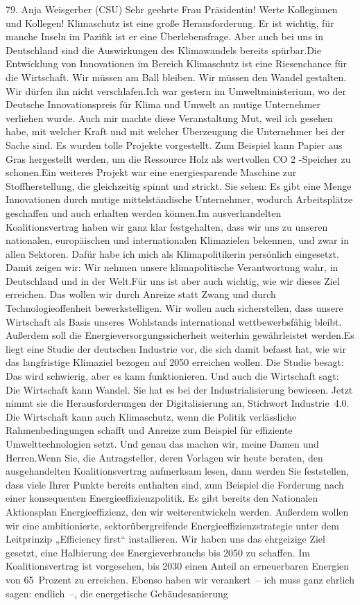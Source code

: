 \documentclass{article}
\begin{document}
	79. Anja Weisgerber (CSU) Sehr geehrte Frau Präsidentin! Werte Kolleginnen und Kollegen! Klimaschutz ist eine große Herausforderung. Er ist wichtig, für manche Inseln im Pazifik ist er eine Überlebensfrage. Aber auch bei uns in Deutschland sind die Auswirkungen des Klimawandels bereits spürbar.Die Entwicklung von Innovationen im Bereich Klimaschutz ist eine Riesenchance für die Wirtschaft. Wir müssen am Ball bleiben. Wir müssen den Wandel gestalten. Wir dürfen ihn nicht verschlafen.Ich war gestern im Umweltministerium, wo der Deutsche Innovationspreis für Klima und Umwelt an mutige Unternehmer verliehen wurde. Auch mir machte diese Veranstaltung Mut, weil ich gesehen habe, mit welcher Kraft und mit welcher Überzeugung die Unternehmer bei der Sache sind. Es wurden tolle Projekte vorgestellt. Zum Beispiel kann Papier aus Gras hergestellt werden, um die Ressource Holz als wertvollen CO 2 -Speicher zu schonen.Ein weiteres Projekt war eine energiesparende Maschine zur Stoffherstellung, die gleichzeitig spinnt und strickt. Sie sehen: Es gibt eine Menge Innovationen durch mutige mittelständische Unternehmer, wodurch Arbeitsplätze geschaffen und auch erhalten werden können.Im ausverhandelten Koalitionsvertrag haben wir ganz klar festgehalten, dass wir uns zu unseren nationalen, europäischen und internationalen Klimazielen bekennen, und zwar in allen Sektoren. Dafür habe ich mich als Klimapolitikerin persönlich eingesetzt. Damit zeigen wir: Wir nehmen unsere klimapolitische Verantwortung wahr, in Deutschland und in der Welt.Für uns ist aber auch wichtig, wie wir dieses Ziel erreichen. Das wollen wir durch Anreize statt Zwang und durch Technologieoffenheit bewerkstelligen. Wir wollen auch sicherstellen, dass unsere Wirtschaft als Basis unseres Wohlstands international wettbewerbsfähig bleibt. Außerdem soll die Energieversorgungssicherheit weiterhin gewährleistet werden.Es liegt eine Studie der deutschen Industrie vor, die sich damit befasst hat, wie wir das langfristige Klimaziel bezogen auf 2050 erreichen wollen. Die Studie besagt: Das wird schwierig, aber es kann funktionieren. Und auch die Wirtschaft sagt: Die Wirtschaft kann Wandel. Sie hat es bei der Industrialisierung bewiesen. Jetzt nimmt sie die Herausforderungen der Digitalisierung an, Stichwort Industrie 4.0. Die Wirtschaft kann auch Klimaschutz, wenn die Politik verlässliche Rahmenbedingungen schafft und Anreize zum Beispiel für effiziente Umwelttechnologien setzt. Und genau das machen wir, meine Damen und Herren.Wenn Sie, die Antragsteller, deren Vorlagen wir heute beraten, den ausgehandelten Koalitionsvertrag aufmerksam lesen, dann werden Sie feststellen, dass viele Ihrer Punkte bereits enthalten sind, zum Beispiel die Forderung nach einer konsequenten Energieeffizienzpolitik. Es gibt bereits den Nationalen Aktionsplan Energieeffizienz, den wir weiterentwickeln werden. Außerdem wollen wir eine ambitionierte, sektorübergreifende Energieeffizienzstrategie unter dem Leitprinzip „Efficiency first“ installieren. Wir haben uns das ehrgeizige Ziel gesetzt, eine Halbierung des Energieverbrauchs bis 2050 zu schaffen. Im Koalitionsvertrag ist vorgesehen, bis 2030 einen Anteil an erneuerbaren Energien von 65 Prozent zu erreichen. Ebenso haben wir verankert – ich muss ganz ehrlich sagen: endlich –, die energetische Gebäudesanierung 
\end{document}
